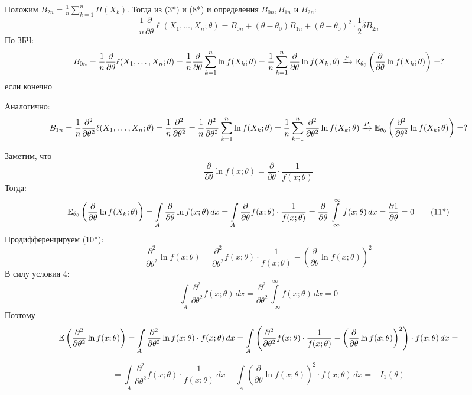 \documentclass[a4paper,11pt]{article}
\begin{document}
{    Положим $B_{2n} = \displaystyle \frac{1}{n}\sum_{k=1}^{n} H(X_k)$. Тогда из (3*) и (8*) и определения $B_{0n}, B_{1n}$ и $B_{2n}$:
    \[\frac{1}{n}\frac{\partial}{\partial\theta}\ell(X_1,\dots, X_n;\theta) = B_{0n} + (\theta - \theta_0)B_{1n} + (\theta - \theta_0)^2\cdot \frac{1}{2}\widetilde{\delta}B_{2n} \tag{9*}\]
    По ЗБЧ:
    \[B_{0n} = \frac{1}{n}\frac{\partial}{\partial\theta}\ell(X_1,\dots, X_n;\theta) = \frac{1}{n}\frac{\partial}{\partial\theta}\sum_{k=1}^{n}\ln f(X_k;\theta) = \frac{1}{n}\sum_{k=1}^{n}\frac{\partial}{\partial\theta}\ln f(X_k;\theta) \xrightarrow{P} \mathbb{E}_{\theta_0}\left(\frac{\partial}{\partial\theta}\ln f(X_k;\theta)\right) = ?\]
    если конечно

    Аналогично:
    \[B_{1n} = \frac{1}{n}\frac{\partial^2}{\partial\theta^2}\ell(X_1,\dots,X_n;\theta) = \frac{1}{n}\frac{\partial^2}{\partial\theta^2} = \frac{1}{n}\frac{\partial^2}{\partial\theta^2}\sum_{k=1}^{n}\ln f(X_k;\theta) = \frac{1}{n}\sum_{k=1}^{n}\frac{\partial^2}{\partial\theta^2}\ln f(X_k;\theta) \xrightarrow{P} \mathbb{E}_{\theta_0}\left(\frac{\partial^2}{\partial\theta^2}\ln f(X_k;\theta)\right) = ?\]

    Заметим, что
    \[\frac{\partial}{\partial\theta} \ln f(x; \theta) = \frac{\partial}{\partial\theta} \cdot \frac{1}{f(x;\theta)} \tag{10*}\]
    Тогда:
    \[\mathbb{E}_{\theta_0}\left(\frac{\partial}{\partial\theta}\ln f(X_k;\theta)\right) = \int\limits_A \frac{\partial}{\partial\theta}\ln f(x;\theta)\,dx = \int\limits_A \frac{\partial}{\partial\theta} f(x;\theta) \cdot \frac{1}{f(x;\theta)} = \frac{\partial}{\partial\theta}\int\limits_{-\infty}^\infty f(x;\theta)\,dx = \frac{\partial 1}{\partial\theta} = 0 \tag{11*}\]
    Продифференцируем (10*):
    \[\frac{\partial^2}{\partial\theta^2} \ln f(x; \theta) = \frac{\partial^2}{\partial\theta^2} f(x; \theta) \cdot \frac{1}{f(x;\theta)} - \left(\frac{\partial}{\partial\theta}\ln f(x;\theta)\right)^2 \tag{12*}\]
    В силу условия 4:
    \[\int\limits_A \frac{\partial^2}{\partial\theta^2}f(x; \theta)\,dx = \frac{\partial^2}{\partial\theta^2}\int\limits_{-\infty}^\infty f(x;\theta)\,dx = 0 \tag{15*}\]
    Поэтому
    \[\mathbb{E}\left(\frac{\partial^2}{\partial\theta^2} \ln f(x; \theta)\right) = \int\limits_A \frac{\partial^2}{\partial\theta^2} \ln f(x; \theta) \cdot f(x;\theta)\,dx = \int\limits_A \left(\frac{\partial^2}{\partial\theta^2} f(x; \theta) \cdot \frac{1}{f(x;\theta)} - \left(\frac{\partial}{\partial\theta}\ln f(x;\theta)\right)^2\right) \cdot f(x;\theta)\,dx =\]

    \[= \int\limits_A\frac{\partial^2}{\partial\theta^2} f(x; \theta) \cdot \frac{1}{f(x;\theta)}\,dx - \int\limits_A \left(\frac{\partial}{\partial\theta}\ln f(x;\theta)\right)^2\cdot f(x;\theta)\,dx = -I_1(\theta) \tag{16*}\]

}
\end{document}
